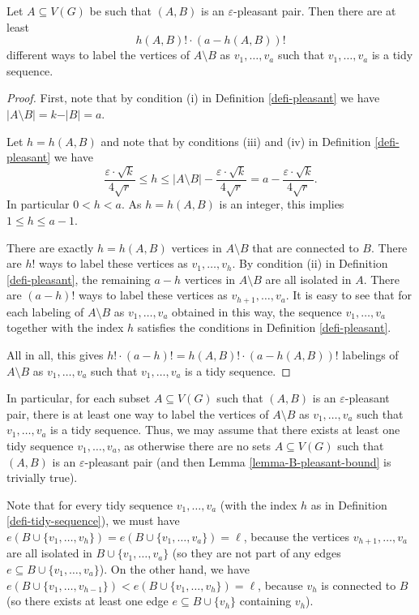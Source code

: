 \begin{claim}\label{claim-count-labelings-tidy} Let $A\subseteq V(G)$ be such that $(A,B)$ is an $\varepsilon$-pleasant pair. Then there are at least
\[h(A,B)!\cdot (a-h(A,B))!\]
different ways to  label the vertices of $A\setminus B$ as $v_1,\dots,v_a$ such that $v_1,\dots,v_a$ is a tidy sequence.
\end{claim}
\begin{proof}First, note that by condition (i) in Definition \ref{defi-pleasant} we have $\vert A\setminus B\vert=k-\vert B\vert=a$.

Let $h=h(A,B)$ and note that by conditions (iii) and (iv) in Definition \ref{defi-pleasant} we have 
\[\frac{\varepsilon\cdot \sqrt{k}}{4\sqrt{r}}\leq h\leq \vert A\setminus B\vert-\frac{\varepsilon\cdot \sqrt{k}}{4\sqrt{r}}=a-\frac{\varepsilon\cdot \sqrt{k}}{4\sqrt{r}}.\]
In particular $0<h<a$. As $h=h(A,B)$ is an integer, this implies $1\leq h\leq a-1$.

There are exactly $h=h(A,B)$ vertices in $A\setminus B$ that are connected to $B$. There are $h!$ ways to label these vertices as $v_1,\dots,v_h$. By condition (ii) in Definition \ref{defi-pleasant}, the remaining $a-h$ vertices in $A\setminus B$ are all isolated in $A$. There are $(a-h)!$ ways to label these vertices as $v_{h+1},\dots,v_a$. It is easy to see that for each labeling of $A\setminus B$ as $v_1,\dots,v_a$ obtained in this way, the sequence $v_1,\dots,v_a$ together with the index $h$ satisfies the conditions in Definition \ref{defi-pleasant}.

All in all, this gives $h!\cdot (a-h)!=h(A,B)!\cdot (a-h(A,B))!$ labelings of $A\setminus B$ as $v_1,\dots,v_a$ such that $v_1,\dots,v_a$ is a tidy sequence.
\end{proof}

In particular, for each subset $A\subseteq V(G)$ such that $(A,B)$ is an $\varepsilon$-pleasant pair, there is at least one way to  label the vertices of $A\setminus B$ as $v_1,\dots,v_a$ such that $v_1,\dots,v_a$ is a tidy sequence. Thus, we may assume that there exists at least one tidy sequence $v_1,\dots,v_a$, as otherwise there are no sets $A\subseteq V(G)$ such that $(A,B)$ is an $\varepsilon$-pleasant pair (and then Lemma \ref{lemma-B-pleasant-bound} is trivially true).

Note that for every tidy sequence $v_1,\dots,v_a$ (with the index $h$ as in Definition \ref{defi-tidy-sequence}), we must have $e(B\cup \lbrace v_1,\dots,v_{h}\rbrace)=e(B\cup \lbrace v_1,\dots,v_a\rbrace)=\ell$, because the vertices $v_{h+1},\dots,v_a$ are all isolated in $B\cup \lbrace v_1,\dots,v_a\rbrace$ (so they are not part of any edges $e\subseteq B\cup \lbrace v_1,\dots,v_a\rbrace$). On the other hand, we have $e(B\cup \lbrace v_1,\dots,v_{h-1}\rbrace)<e(B\cup \lbrace v_1,\dots,v_{h}\rbrace)=\ell$, because $v_{h}$ is connected to $B$ (so  there exists at least one edge $e\subseteq B\cup \lbrace v_h\rbrace$ containing $v_{h}$).

